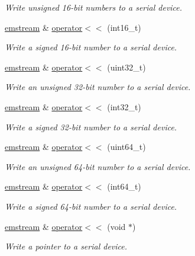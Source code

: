 \begin{DoxyCompactItemize}
\begin{DoxyCompactList}\small\item\em Write unsigned 16-\/bit numbers to a serial device. \end{DoxyCompactList}\item 
\mbox{\hyperlink{classemstream}{emstream}} \& \mbox{\hyperlink{classemstream_a40243877b820b91c9798e99fd565f85f}{operator$<$$<$}} (int16\+\_\+t)
\begin{DoxyCompactList}\small\item\em Write a signed 16-\/bit number to a serial device. \end{DoxyCompactList}\item 
\mbox{\hyperlink{classemstream}{emstream}} \& \mbox{\hyperlink{classemstream_aa3915880211b615d4f889036683c53c3}{operator$<$$<$}} (uint32\+\_\+t)
\begin{DoxyCompactList}\small\item\em Write an unsigned 32-\/bit number to a serial device. \end{DoxyCompactList}\item 
\mbox{\hyperlink{classemstream}{emstream}} \& \mbox{\hyperlink{classemstream_abf54c92665eaecae12af886b4275ded3}{operator$<$$<$}} (int32\+\_\+t)
\begin{DoxyCompactList}\small\item\em Write a signed 32-\/bit number to a serial device. \end{DoxyCompactList}\item 
\mbox{\hyperlink{classemstream}{emstream}} \& \mbox{\hyperlink{classemstream_aad47341203535f0c3b8d34f63fa0723f}{operator$<$$<$}} (uint64\+\_\+t)
\begin{DoxyCompactList}\small\item\em Write an unsigned 64-\/bit number to a serial device. \end{DoxyCompactList}\item 
\mbox{\hyperlink{classemstream}{emstream}} \& \mbox{\hyperlink{classemstream_ad0b6eeba3130fb192413f43cfb1670fe}{operator$<$$<$}} (int64\+\_\+t)
\begin{DoxyCompactList}\small\item\em Write a signed 64-\/bit number to a serial device. \end{DoxyCompactList}\item 
\mbox{\hyperlink{classemstream}{emstream}} \& \mbox{\hyperlink{classemstream_a87d81e918bc1baa294ee9c9c3d056ea7}{operator$<$$<$}} (void $\ast$)
\begin{DoxyCompactList}\small\item\em Write a pointer to a serial device. \end{DoxyCompactList}\item 

\end{DoxyCompactItemize}

